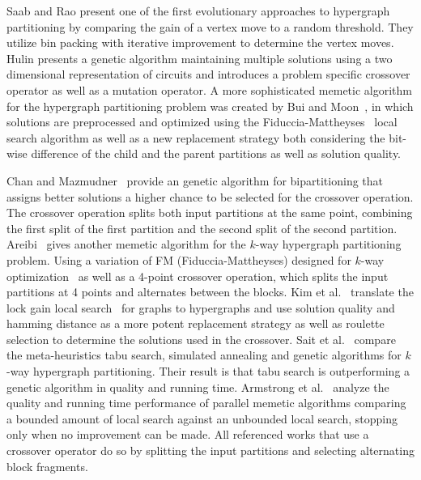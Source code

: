 \documentclass[a4paper,12pt,titlepage, BCOR7mm,headsepline]{scrbook}
\numberwithin{equation}{section}
\begin{document}
Saab and Rao \cite{saab1989evolution} present one of the first evolutionary approaches to hypergraph partitioning %
by comparing the gain of a vertex move to a random threshold. They utilize bin packing with iterative improvement to determine the vertex moves. 
Hulin \cite{hulin1990circuit} presents a genetic algorithm maintaining multiple solutions using a two dimensional representation of circuits and introduces a problem specific crossover operator as well as a mutation operator. A more sophisticated memetic algorithm for the hypergraph partitioning problem was created by Bui and Moon~\cite{bui1994fast}, in which solutions are preprocessed and optimized using the Fiduccia-Mattheyses~\cite{fiduccia1988linear} local search algorithm as well as a new replacement strategy both considering the bit-wise difference of the child and the parent partitions as well as solution quality. 

Chan and Mazmudner~\cite{chan1995systolic} provide an genetic algorithm for bipartitioning that assigns better solutions a higher chance to be selected for the crossover operation. The crossover operation splits both input partitions at the same point, combining the first split of the first partition and the second split of the second partition.
Areibi~\cite{areibi2000integrated} gives another memetic algorithm for the $k$-way hypergraph partitioning problem. Using a variation of FM (Fiduccia-Mattheyses) designed for $k$-way optimization~\cite{sanchis1989multiple} as well as a 4-point crossover operation, which splits the input partitions at 4 points and alternates between the blocks.
Kim et al.~\cite{kim2004hybrid} translate the lock gain local search~\cite{kim2004lock} for graphs to hypergraphs and use solution quality and hamming distance as a more potent replacement strategy as well as roulette selection to determine the solutions used in the crossover.
 Sait et al.~\cite{sait2006evolutionary} compare the meta-heuristics tabu search, simulated annealing and genetic algorithms for $k$-way hypergraph partitioning. Their result is that tabu search is outperforming a genetic algorithm in quality and running time.
Armstrong et al.~\cite{armstrong2010investigation} analyze the quality and running time performance of parallel memetic algorithms comparing a bounded amount of local search against an unbounded local search, stopping only when no improvement can be made. All referenced works that use a crossover operator do so by splitting the input partitions and selecting alternating block fragments.
\end{document}
